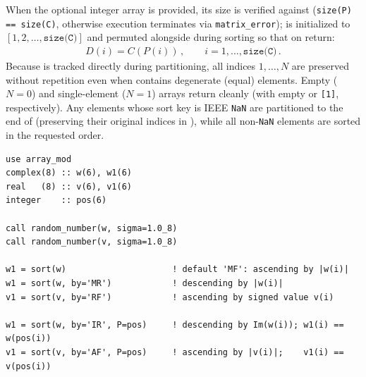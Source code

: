 When the optional integer array  is provided, its size is verified against  (\texttt{size(P) == size(C)}, otherwise execution terminates via \texttt{matrix\_error});  is initialized to $[1, 2, \ldots, \texttt{size(C)}]$ and permuted alongside  during sorting so that on return:
\begin{align}
  D(i) = C(P(i))\, , \qquad i = 1,\ldots,\texttt{size(C)}\, .
\end{align}
Because  is tracked directly during partitioning, all indices $1,\ldots,N$ are preserved without repetition even when  contains degenerate (equal) elements. Empty ($N = 0$) and single-element ($N = 1$) arrays return cleanly (with  empty or \texttt{[1]}, respectively). Any elements whose sort key is IEEE \texttt{NaN} are partitioned to the end of  (preserving their original indices in ), while all non-\texttt{NaN} elements are sorted in the requested order.

\begin{description}[leftmargin=2.2cm, style=nextline]
\end{description}

\lstset{language=[95]Fortran}
\begin{lstlisting}
use array_mod
complex(8) :: w(6), w1(6)
real   (8) :: v(6), v1(6)
integer    :: pos(6)

call random_number(w, sigma=1.0_8)
call random_number(v, sigma=1.0_8)

w1 = sort(w)                     ! default 'MF': ascending by |w(i)|
w1 = sort(w, by='MR')            ! descending by |w(i)|
v1 = sort(v, by='RF')            ! ascending by signed value v(i)

w1 = sort(w, by='IR', P=pos)     ! descending by Im(w(i)); w1(i) == w(pos(i))
v1 = sort(v, by='AF', P=pos)     ! ascending by |v(i)|;    v1(i) == v(pos(i))
\end{lstlisting}

